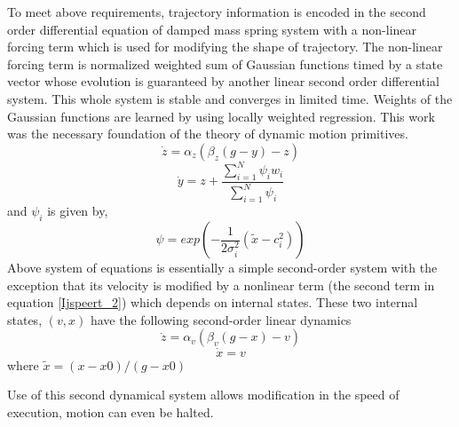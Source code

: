 To meet above requirements, trajectory information is encoded in the second order differential equation of damped mass spring system with a non-linear forcing term which is used for modifying the shape of trajectory. The non-linear forcing term is normalized weighted sum of Gaussian functions timed by a state vector whose evolution is guaranteed by another linear second order differential system. This whole system is stable and converges in limited time. Weights of the Gaussian functions are learned by using locally weighted regression. This work was the necessary foundation of the theory of dynamic motion primitives. 
\begin{equation} \label{Ijspeert_1}
	\dot{z} = \alpha_{z}(\beta_{z}(g - y) - z)
\end{equation}
\begin{equation} \label{Ijspeert_2}
	\dot{y} = z + \frac{\sum_{i=1}^{N}\psi_{i}w_{i}}{\sum_{i=1}^{N}\psi_{i}}
\end{equation}
and $\psi_{i}$ is given by,
\begin{equation}
\psi = exp(-\frac{1}{2\sigma_{i}^{2}}(\tilde{x} - c_{i}^{2}))
\end{equation}
Above system of equations is essentially a simple second-order system with the exception that its velocity is modified by a nonlinear term (the second term in equation \ref{Ijspeert_2}) which depends on internal states. These two internal states, $(v,x)$ have the following second-order linear dynamics
\begin{equation}
\dot{z} = \alpha_{v}(\beta_{v}(g - x) - v)
\end{equation}
\begin{equation}
\dot{x} = v
\end{equation}
where $\tilde{x} = (x - x0)/(g - x0)$


Use of this second dynamical system allows modification in the speed of execution, motion can even be halted. 


